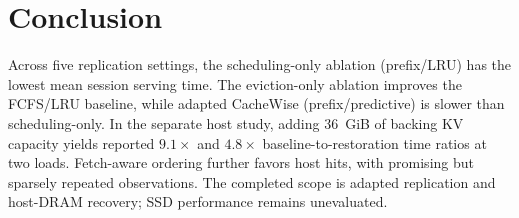 \section{Conclusion}
\label{sec:conclusion}

Across five replication settings, the scheduling-only ablation (prefix/LRU) has the lowest mean session serving time.
The eviction-only ablation improves the FCFS/LRU baseline, while adapted CacheWise (prefix/predictive) is slower than scheduling-only.
In the separate host study, adding 36~GiB of backing KV capacity yields reported $9.1\times$ and $4.8\times$ baseline-to-restoration time ratios at two loads.
Fetch-aware ordering further favors host hits, with promising but sparsely repeated observations.
The completed scope is adapted replication and host-DRAM recovery; SSD performance remains unevaluated.
